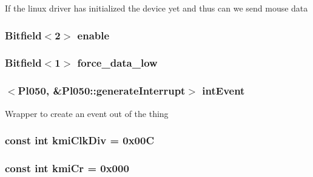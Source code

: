 \label{classPl050_aed3536f6eab29208a570ebb75f43a9ce}
If the linux driver has initialized the device yet and thus can we send mouse data \hypertarget{classPl050_a10e20e217e3d67e2d20eed7ba60b5abf}{
\subsubsection[{enable}]{\setlength{\rightskip}{0pt plus 5cm}Bitfield$<$2$>$ {\bf enable}}}
\label{classPl050_a10e20e217e3d67e2d20eed7ba60b5abf}
\hypertarget{classPl050_ac85a33c0241e926e1e133ec81ea09e1b}{
\subsubsection[{force\_\-data\_\-low}]{\setlength{\rightskip}{0pt plus 5cm}Bitfield$<$1$>$ {\bf force\_\-data\_\-low}}}
\label{classPl050_ac85a33c0241e926e1e133ec81ea09e1b}
\hypertarget{classPl050_af9021b7232a0425b2cc0f8c778ef44dc}{
\subsubsection[{intEvent}]{$<${\bf Pl050}, \&Pl050::generateInterrupt$>$ {\bf intEvent}}}
\label{classPl050_af9021b7232a0425b2cc0f8c778ef44dc}
Wrapper to create an event out of the thing \hypertarget{classPl050_a4199383ce9d3a94925b34a565f984079}{
\subsubsection[{kmiClkDiv}]{\setlength{\rightskip}{0pt plus 5cm}const int {\bf kmiClkDiv} = 0x00C}}
\label{classPl050_a4199383ce9d3a94925b34a565f984079}
\hypertarget{classPl050_a94aa9060c3488d5cdfb2dd78c874d207}{
\subsubsection[{kmiCr}]{\setlength{\rightskip}{0pt plus 5cm}const int {\bf kmiCr} = 0x000}}
